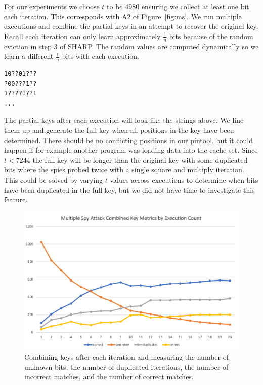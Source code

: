 \documentclass[12pt]{article}
\begin{document}
For our experiments we choose $t$ to be $4980$ ensuring we collect at least one bit each iteration.
This corresponds with A2 of Figure~\ref{fig:ms}.
We run multiple executions and combine the partial keys in an attempt to recover the original key.
Recall each iteration can only learn approximately $\frac{1}{n}$ bits because of the random eviction in step $3$ of SHARP.
The random values are computed dynamically so we learn a different $\frac{1}{n}$ bits with each execution.

\begin{verbatim}
10??01???
?00???1??
1????1??1
...
\end{verbatim}

The partial keys after each execution will look like the strings above.
We line them up and generate the full key when all positions in the key have been determined.
There should be no conflicting positions in our pintool, but it could happen if for example another program was loading data into the cache set.
Since $t<7244$ the full key will be longer than the original key with some duplicated bits where the spies probed twice with a single square and multiply iteration.
This could be solved by varying $t$ values across executions to determine when bits have been duplicated in the full key, but we did not have time to investigate this feature.

\begin{figure}[h]
\centering
\includegraphics[scale=0.7]{../presentation/mult-spy-p.png}
\caption{Combining keys after each iteration and measuring the number of unknown bits, the number of duplicated iterations, the number of incorrect matches, and the number of correct matches.}
\label{fig:msp}
\end{figure}
\end{document}
